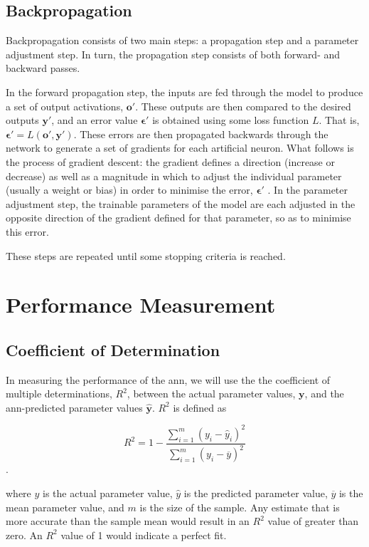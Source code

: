 \documentclass[11pt,oneside,openany,a4paper,english, report, goldenblock
]{usthesis}
\begin{document}
\subsection{Backpropagation}
Backpropagation consists of two main steps: a propagation step and a parameter adjustment step. In turn, the propagation step consists of both forward- and backward passes. 

In the forward propagation step, the inputs are fed through the model to produce a set of output activations, $\mathbf{o'}$. These outputs are then compared to the desired outputs $\mathbf{y'}$, and an error value $\mathbf{\epsilon'}$ is obtained using some loss function $L$. That is, $\mathbf{\epsilon'} = L\left(\mathbf{o'}, \mathbf{y'}\right)$. These errors are then propagated backwards through the network to generate a set of gradients for each artificial neuron. What follows is the process of gradient descent: the gradient defines a direction (increase or decrease) as well as a magnitude in which to adjust the individual parameter (usually a weight or bias) in order to minimise the error, $\mathbf{\epsilon'}$ . In the parameter adjustment step, the trainable parameters of the model are each adjusted in the opposite direction of the gradient defined for that parameter, so as to minimise this error.

These steps are repeated until some stopping criteria is reached.

\section{Performance Measurement}
\subsection{Coefficient of Determination}
In measuring the performance of the \acrshort{ann}, we will use the the coefficient of multiple determinations, $ R^2 $, between the actual parameter values, $ \mathbf{y} $, and the \acrshort{ann}-predicted parameter values $ \mathbf{\hat{y}}$. $ R^2 $ is defined as

\begin{equation}
R^2 = 1 - \frac{\sum_{i=1}^{m}\left(y_i-\hat{y}_i\right)^2}{\sum_{i=1}^{m}\left(y_i-\overline{y}\right)^2}
\end{equation}.

where $y$ is the actual parameter value, $\hat{y}$ is the predicted parameter value, $\overline{y}$ is the mean parameter value, and $m$ is the size of the sample. Any estimate that is more accurate than the sample mean would result in an $ R^2 $ value of greater than zero. An $ R^2 $ value of 1 would indicate a perfect fit.
\end{document}
